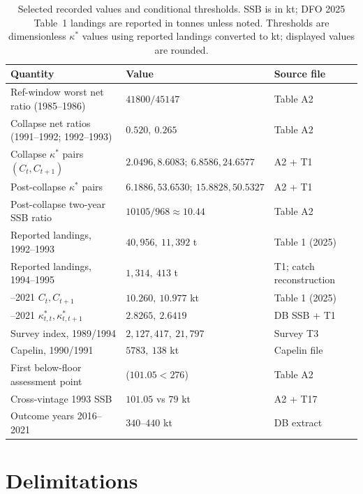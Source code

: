 \documentclass[10pt,twocolumn]{article}
\theoremstyle{plain}
\theoremstyle{remark}
\begin{document}
\begin{table}[t]
\centering
\scriptsize
\setlength{\tabcolsep}{4pt}
\renewcommand{\arraystretch}{1.12}
\caption{Selected recorded values and conditional thresholds. SSB is in kt; DFO 2025 Table~1 landings are reported in tonnes unless noted. Thresholds are dimensionless \(\kappa^*\) values using reported landings converted to kt; displayed values are rounded.}
\label{tab:summary}
\begin{tabularx}{\textwidth}{@{}>{\raggedright\arraybackslash}p{}>{\raggedright\arraybackslash}p{}>{\raggedright\arraybackslash}X@{}}
\toprule
Quantity & Value & Source file \\
\midrule
Ref-window worst net ratio (1985--1986) & \(41800/45147\) & Table A2 \\
Collapse net ratios (1991--1992; 1992--1993) & \(0.520,\ 0.265\) & Table A2 \\
Collapse \(\kappa^*\) pairs \((C_t,C_{t+1})\) & \(2.0496,8.6083;\ 6.8586,24.6577\) & A2 + T1 \\
Post-collapse \(\kappa^*\) pairs & \(6.1886,53.6530;\ 15.8828,50.5327\) & A2 + T1 \\
Post-collapse two-year SSB ratio & \(10105/968 \approx 10.44\) & Table A2 \\
Reported landings, 1992--1993 & \(40{,}956,\ 11{,}392\) t & Table 1 (2025) \\
Reported landings, 1994--1995 & \(1{,}314,\ 413\) t & T1; catch reconstruction \\
2020--2021 \(C_t,C_{t+1}\) & \(10.260,\ 10.977\) kt & Table 1 (2025) \\
2020--2021 \(\kappa^*_{t,t},\kappa^*_{t,t+1}\) & \(2.8265,\ 2.6419\) & DB SSB + T1 \\
Survey index, 1989/1994 & \(2{,}127{,}417,\ 21{,}797\) & Survey T3 \\
Capelin, 1990/1991 & \(5783,\ 138\) kt & Capelin file \\
First below-floor assessment point & 1993 (\(101.05 < 276\)) & Table A2 \\
Cross-vintage 1993 SSB & \(101.05\) vs \(79\) kt & A2 + T17 \\
Outcome years 2016--2021 & \(340\)--\(440\) kt & DB extract \\
\bottomrule
\end{tabularx}
\end{table}

\section{Delimitations}\label{scope}
\end{document}

